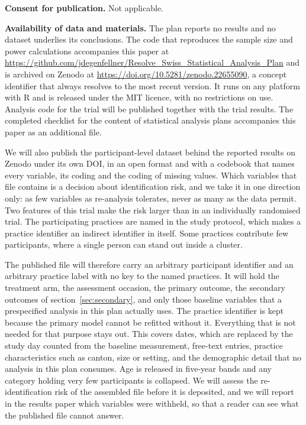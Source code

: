 \documentclass[11pt,a4paper]{article}
\begin{document}
\textbf{Consent for publication.} Not applicable.

\textbf{Availability of data and materials.} The plan reports no results and
no dataset underlies its conclusions. The code that reproduces the
sample size and power calculations accompanies this paper at
\url{https://github.com/jdegenfellner/Resolve_Swiss_Statistical_Analysis_Plan}
and is archived on Zenodo at
\url{https://doi.org/10.5281/zenodo.22655090}, a concept identifier that
always resolves to the most recent version.
It runs on any platform with R and is released under the MIT licence, with no
restrictions on use.
Analysis code for the trial will be published together with the trial
results. The completed checklist for the content of statistical analysis
plans \citep{gamble2017} accompanies this paper as an additional file.

We will also publish the participant-level dataset behind the reported
results on Zenodo under its own DOI, in an open format and with a codebook
that names every variable, its coding and the coding of missing values.
Which variables that file contains is a decision about identification risk,
and we take it in one direction only: as few variables as re-analysis
tolerates, never as many as the data permit. Two features of this trial make
the risk larger than in an individually randomised trial. The participating
practices are named in the study protocol, which makes a practice identifier
an indirect identifier in itself. Some practices contribute few
participants, where a single person can stand out inside a cluster.

The published file will therefore carry an arbitrary participant identifier
and an arbitrary practice label with no key to the named practices. It will
hold the treatment arm, the assessment occasion, the primary outcome, the
secondary outcomes of section~\ref{sec:secondary}, and only those baseline
variables that a prespecified analysis in this plan actually uses.
The practice identifier is kept because the primary model cannot be refitted
without it. Everything that is not needed for that purpose stays out. This
covers dates, which are replaced by the study day counted from the baseline
measurement, free-text entries, practice characteristics such as canton,
size or setting, and the demographic detail that no analysis in this plan
consumes. Age is released in five-year bands and any category holding very
few participants is collapsed. We will assess the re-identification risk of
the assembled file before it is deposited, and we will report in the results
paper which variables were withheld, so that a reader can see what the
published file cannot answer.
\end{document}
